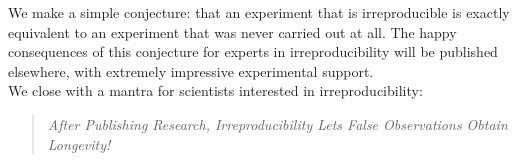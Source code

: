 \documentclass[a4paper,11pt]{article}
\begin{document}
We make a simple conjecture: {that an experiment that is
irreproducible is exactly equivalent to an experiment that was never
carried out at all}. The happy consequences of this conjecture for
experts in irreproducibility will be published elsewhere, with
extremely impressive experimental support.\\

\noindent We close with a mantra for scientists interested in irreproducibility:
\begin{quote}
\emph{After
Publishing
Research,
Irreproducibility 
Lets
False
Observations
Obtain
Longevity!}
\end{quote}














\end{document}
